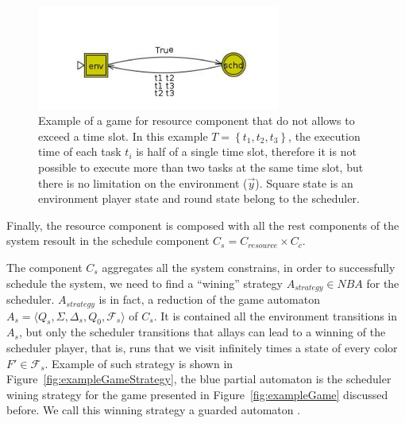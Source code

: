 \documentclass[ twoside, 12pt ]{article}
\begin{document}
\begin{figure} [h]
    \centerline{\includegraphics[width=80mm]{reasourceGame.jpg}}
    \caption{Example of a game for resource component that do not allows to exceed a time slot. 
        In this example $T = \left\{ t_1 , t_2 , t_3 \right\}$, the execution time of each task $t_i$ is half of a single time slot, therefore it is not possible to execute more than two tasks at the same time slot, but there is no limitation on the environment ($\vec{y}$).
        Square state is an environment player state and round state belong to the scheduler.  }
    \label{fig:C_resource}
\end{figure}

Finally, the resource component is composed with all the rest components of the system resoult in the schedule component $C_s = C_{resource} \times C_c$.

The component $C_s$ aggregates all the system constrains, in order to successfully schedule the system, we need to find a ``wining'' strategy $A_{strategy} \in NBA$ for the scheduler.
$A_{strategy}$ is in fact, a reduction of the game automaton $A_s = \langle Q_s ,\Sigma,\Delta_s, Q_0, \mathcal{F}_s \rangle$ of $C_s$. It is contained all the environment transitions in $A_s$, but only the scheduler transitions that allays can lead to a winning of the scheduler player, that is, runs that we visit infinitely times a state of every color $F' \in \mathcal{F}_s$.
Example of such strategy is shown in Figure~\ref{fig:exampleGameStrategy}, the blue partial automaton is the scheduler wining strategy for the game presented in Figure~\ref{fig:exampleGame} discussed before.
We call this winning strategy a guarded automaton .
\end{document}
